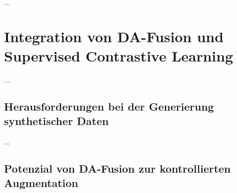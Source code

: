 
...

\section{Integration von DA-Fusion und Supervised Contrastive Learning}

...

\subsection{Herausforderungen bei der Generierung synthetischer Daten}

...

\subsection{Potenzial von DA-Fusion zur kontrollierten Augmentation}

